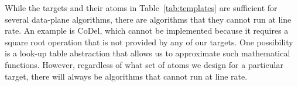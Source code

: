 While the targets and their atoms in Table~\ref{tab:templates} are sufficient
for several data-plane algorithms, there are algorithms that they cannot run at
line rate.  An example is CoDel, which cannot be implemented because it
requires a square root operation that is not provided by any of our targets.
One possibility is a look-up table abstraction that allows us to approximate
such mathematical functions. However, regardless of what set of atoms we design
for a particular target, there will always be algorithms that cannot run at
line rate.


